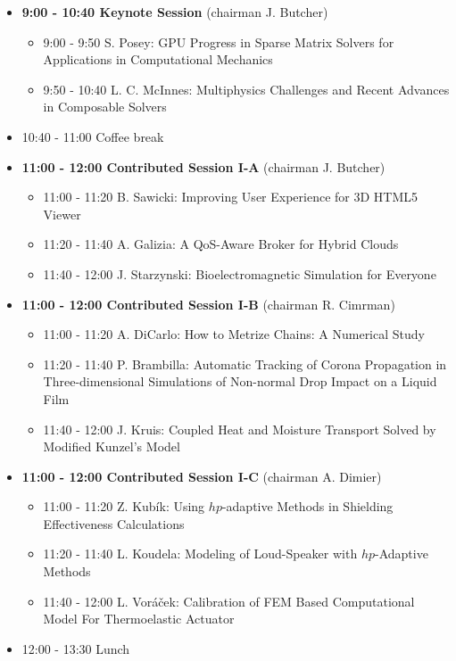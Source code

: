 \documentclass[10pt, A4]{article}%
\begin{document}
\begin{itemize}    
  \item {\bf 9:00 - 10:40 Keynote Session} (chairman J. Butcher) 
  \begin{itemize}
    \item 9:00 - 9:50 S. Posey: GPU Progress in Sparse Matrix Solvers for Applications in Computational Mechanics
    \item 9:50 - 10:40 L. C. McInnes: Multiphysics Challenges and Recent Advances in Composable Solvers
  \end{itemize}
  \item 10:40 - 11:00 Coffee break
  \item {\bf 11:00 - 12:00 Contributed Session I-A} (chairman J. Butcher) 
  \begin{itemize}
    \item 11:00 - 11:20 B. Sawicki: Improving User Experience for 3D HTML5 Viewer
    \item 11:20 - 11:40 A. Galizia: A QoS-Aware Broker for Hybrid Clouds
    \item 11:40 - 12:00 J. Starzynski: Bioelectromagnetic Simulation for Everyone 
  \end{itemize}
  \item {\bf 11:00 - 12:00 Contributed Session I-B} (chairman R. Cimrman) 
  \begin{itemize}
	\item 11:00 - 11:20 A. DiCarlo: How to Metrize Chains: A Numerical Study  
    \item 11:20 - 11:40 P. Brambilla: Automatic Tracking of Corona Propagation in Three-dimensional Simulations of Non-normal Drop Impact on a Liquid Film       
    \item 11:40 - 12:00 J. Kruis: Coupled Heat and Moisture Transport Solved by Modified Kunzel's Model
  \end{itemize}
  \item {\bf 11:00 - 12:00 Contributed Session I-C} (chairman A. Dimier) 
  \begin{itemize}
    \item 11:00 - 11:20 Z. Kub\'{i}k: Using $hp$-adaptive Methods in Shielding Effectiveness Calculations
    \item 11:20 - 11:40 L. Koudela: Modeling of Loud-Speaker with $hp$-Adaptive Methods  
    \item 11:40 - 12:00 L. Vor\'{a}\v{c}ek: Calibration of FEM Based Computational Model For Thermoelastic Actuator       
  \end{itemize}
  \item 12:00 - 13:30 Lunch

\end{itemize}
\end{document}
